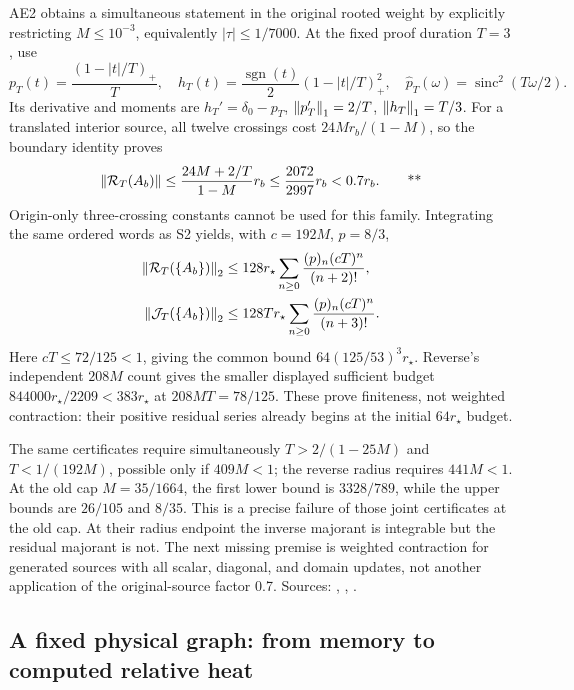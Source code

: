 AE2 obtains a simultaneous statement in the original rooted weight by explicitly
restricting $M\le10^{-3}$, equivalently $|\tau|\le1/7000$.  At the fixed proof
duration $T=3$, use
\begin{equation}
 p_T(t)=\frac{(1-|t|/T)_+}{T},\quad
 h_T(t)=\frac{\operatorname{sgn}(t)}2(1-|t|/T)_+^2,
 \quad \widehat p_T(\omega)=\operatorname{sinc}^2(T\omega/2).
 \label{recent:compact-kernel}
\end{equation}
Its derivative and moments are $h_T'=\delta_0-p_T$,
$\left\lVert p_T'\right\rVert_1=2/T$, $\left\lVert h_T\right\rVert_1=T/3$.  For a translated interior source,
all twelve crossings cost $24Mr_b/(1-M)$, so the boundary identity proves
\begin{equation}
 \left\lVert \mathcal R_T(A_b)\right\rVert
 \le\frac{24M+2/T}{1-M}r_b
 \le\frac{2072}{2997}r_b<0.7r_b. \qquad\text{**}
 \label{recent:compact-contraction}
\end{equation}
Origin-only three-crossing constants cannot be used for this family.
Integrating the same ordered words as S2 yields, with $c=192M$, $p=8/3$,
\begin{align}
 \left\lVert \mathcal R_T(\{A_b\})\right\rVert_2
 &\le128r_\star\sum_{n\ge0}\frac{(p)_n(cT)^n}{(n+2)!},\notag\\
 \left\lVert \mathcal J_T(\{A_b\})\right\rVert_2
 &\le128Tr_\star\sum_{n\ge0}\frac{(p)_n(cT)^n}{(n+3)!}.
 \label{recent:compact-weighted}
\end{align}
Here $cT\le72/125<1$, giving the common bound $64(125/53)^3r_\star$.
Reverse's independent $208M$ count gives the smaller displayed sufficient
budget $844000r_\star/2209<383r_\star$ at $208MT=78/125$.
These prove finiteness, not weighted contraction: their positive residual
series already begins at the initial $64r_\star$ budget.

The same certificates require simultaneously
$T>2/(1-25M)$ and $T<1/(192M)$, possible only if $409M<1$; the reverse radius
requires $441M<1$.  At the old cap $M=35/1664$, the first lower bound is
$3328/789$, while the upper bounds are $26/105$ and $8/35$.  This is a precise
failure of those joint certificates at the old cap.  At their radius endpoint
the inverse majorant is integrable but the residual majorant is not.  The next
missing premise is weighted contraction for generated sources with all scalar,
diagonal, and domain updates, not another application of the original-source
factor 0.7.
Sources: ,
,
.

\subsection{A fixed physical graph: from memory to computed relative heat}
\label{recent:finite-graph}

